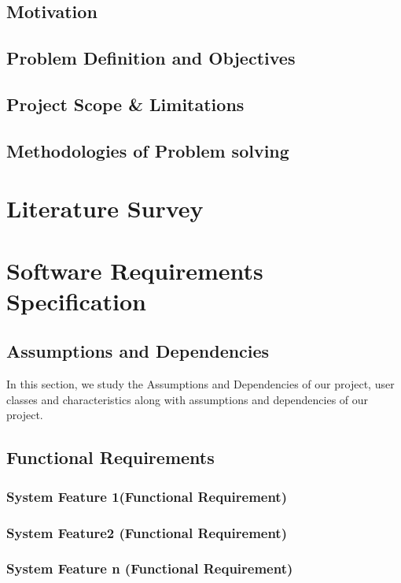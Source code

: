 \documentclass[oneside,a4paper,12pt]{book}
\begin{document}
\section{Motivation}

\section{Problem Definition and Objectives}

\section{Project Scope \& Limitations }

\section{Methodologies of Problem solving}

\chapter{Literature Survey}




\chapter{Software Requirements Specification}

\section{Assumptions and Dependencies}
In this section, we study the Assumptions and Dependencies of our project, user classes and characteristics along with assumptions and dependencies of our project.

\section{Functional Requirements}
\subsection{System Feature 1(Functional Requirement)}
\subsection{System Feature2 (Functional Requirement)}
\subsection{System Feature n (Functional Requirement)}
\end{document}
